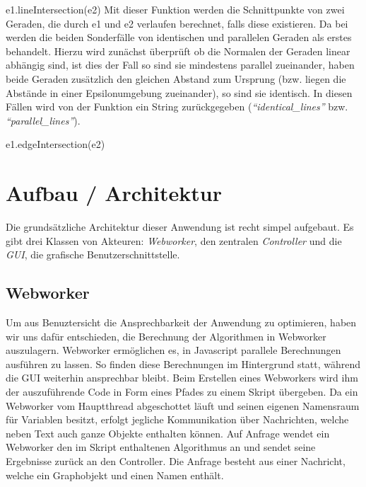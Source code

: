 \documentclass[a4paper,twocolumn]{scrartcl}
\newcommand{\lststyle}[1]{{\usefont{T1}{pcr}{m}{n}\small\selectfont#1}}
\begin{document}
\begin{description}[font=\normalfont]
  \item{\lststyle{e1.lineIntersection(e2)}}
    Mit dieser Funktion werden die Schnittpunkte von zwei Geraden, die durch e1 und e2 verlaufen berechnet, falls diese existieren. Da bei werden die beiden Sonderfälle von identischen und parallelen Geraden als erstes behandelt. Hierzu wird zunächst überprüft ob die Normalen der Geraden linear abhängig sind, ist dies der Fall so sind sie mindestens parallel zueinander, haben beide Geraden zusätzlich den gleichen Abstand zum Ursprung (bzw. liegen die Abstände in einer Epsilonumgebung zueinander), so sind sie identisch. In diesen Fällen wird von der Funktion ein String zurückgegeben (\emph{``identical\_lines''} bzw. \emph{``parallel\_lines''}).
  \item{\lststyle{e1.edgeIntersection(e2)}}
\end{description}



\section{Aufbau / Architektur}
Die grundsätzliche Architektur dieser Anwendung ist recht simpel aufgebaut. Es gibt drei Klassen von Akteuren: \emph{Webworker}, den zentralen \emph{Controller} und die \emph{GUI}, die grafische Benutzerschnittstelle.

\subsection{Webworker}
Um aus Benuztersicht die Ansprechbarkeit der Anwendung zu optimieren, haben wir uns dafür entschieden, die Berechnung der Algorithmen in Webworker auszulagern. Webworker ermöglichen es, in Javascript parallele Berechnungen ausführen zu lassen. So finden diese Berechnungen im Hintergrund statt, während die GUI weiterhin ansprechbar bleibt.
Beim Erstellen eines Webworkers wird ihm der auszuführende Code in Form eines Pfades zu einem Skript übergeben.
Da ein Webworker vom Hauptthread abgeschottet läuft und seinen eigenen Namensraum für Variablen besitzt, erfolgt jegliche Kommunikation über Nachrichten, welche neben Text auch ganze Objekte enthalten können.
Auf Anfrage wendet ein Webworker den im Skript enthaltenen Algorithmus an und sendet seine Ergebnisse zurück an den Controller. Die Anfrage besteht aus einer Nachricht, welche ein Graphobjekt und einen Namen enthält.
\end{document}

